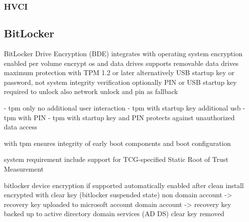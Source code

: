 \subsubsection{HVCI}
\subsection{BitLocker}


\cite[8.4 BitLocker Drive encryption]{windows-internals-5}
BitLocker Drive Encryption (BDE) integrates with operating system
encryption enabled per volume
encrypt os and data drives
supports removable data drives
maximum protection with TPM 1.2 or later
alternatively USB startup key or password, not system integrity verification
optionally PIN or USB startup key required to unlock
also network unlock and pin as fallback

- tpm only
no additional user interaction
- tpm with startup key
additional usb
- tpm with PIN
- tpm with startup key and PIN
protects against unauthorized data access

with tpm ensures integrity of early boot components and boot configuration


system requirement
include support for TCG-specified Static Root of Trust Measurement

bitlocker device encryption if supported automatically enabled
after clean install encrypted with clear key (bitlocker suspended state)
non domain account -> recovery key uploaded to microsoft account
domain account -> recovery key backed up to active directory domain services (AD DS)
clear key removed

